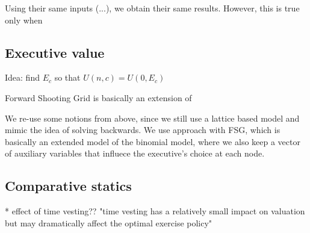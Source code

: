 Using their same inputs (...), we obtain their same results. However, this is true only when 





\subsection{Executive value}



Idea: find $E_c$ so that $U(n, c) = U(0, E_c)$

Forward Shooting Grid is basically an extension of 

We re-use some notions from above, since we still use a lattice based model and mimic the idea of solving backwards.
We use \cite{lau2005valuation} approach with FSG, which is basically an extended model of the binomial model, where we also keep a vector of auxiliary variables that influece the executive's choice at each node. 




\subsection{Comparative statics}



* effect of time vesting?? "time vesting has a relatively small impact on valuation but may dramatically affect the optimal exercise policy" \cite{dybvig2003employee}

